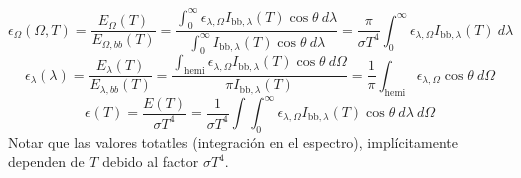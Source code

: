 \documentclass[letterpaper,10pt,english]{jupyterBook}
\begin{document}
\sphinxAtStartPar
{}
\label{equation:6_RadiacionTermica/6_RadiacionTermica:56d96298-1633-45cd-a604-fa48e7e5279c}\begin{equation}
\epsilon_\Omega(\Omega,T) = \frac{E_\Omega(T)}{E_{\Omega,bb}(T)} =\frac{\int_0^\infty \epsilon_{\lambda,\Omega} I_{\mathrm{bb},\lambda} (T)\cos\theta~d\lambda}{\int_0^\infty I_{\mathrm{bb},\lambda} (T)\cos\theta~d\lambda} = \frac{\pi}{\sigma T^4}\int_0^\infty \epsilon_{\lambda,\Omega} I_{\mathrm{bb},\lambda} (T)~d\lambda
\end{equation}
\sphinxAtStartPar
{}
\label{equation:6_RadiacionTermica/6_RadiacionTermica:8cb7ba4c-f6fb-42be-9785-6825f28b58c3}\begin{equation}
\epsilon_\lambda(\lambda) = \frac{E_\lambda(T)}{E_{\lambda,bb}(T)} = \frac{\int_\mathrm{hemi}\epsilon_{\lambda,\Omega}I_{\mathrm{bb},\lambda}(T)\cos\theta~d\Omega}{\pi I_{\mathrm{bb},\lambda}(T)}  = \frac{1}{\pi}\int_\mathrm{hemi}\epsilon_{\lambda,\Omega}\cos\theta~d\Omega
\end{equation}
\sphinxAtStartPar
{}
\label{equation:6_RadiacionTermica/6_RadiacionTermica:1dacb1e1-3c11-4880-91f7-b6aea703c4d9}\begin{equation}
\epsilon(T) = \frac{E(T)}{\sigma T^4} =\frac{1}{\sigma T^4}\int\int_0^\infty \epsilon_{\lambda,\Omega} I_{\mathrm{bb},\lambda} (T)\cos\theta~d\lambda~d\Omega
\end{equation}
\sphinxAtStartPar
Notar que las valores totatles (integración en el espectro), implícitamente dependen de \(T\) debido al factor \(\sigma T^4\).
\end{document}
